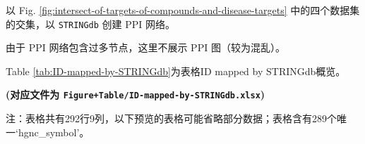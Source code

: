 \documentclass[
]{article}
\begin{document}
以 Fig. \ref{fig:intersect-of-targets-of-compounds-and-disease-targets} 中的四个数据集的交集，以 \texttt{STRINGdb} 创建 PPI 网络。

由于 PPI 网络包含过多节点，这里不展示 PPI 图（较为混乱）。

Table \ref{tab:ID-mapped-by-STRINGdb}为表格ID mapped by STRINGdb概览。

\textbf{(对应文件为 \texttt{Figure+Table/ID-mapped-by-STRINGdb.xlsx})}

\begin{center}\begin{tcolorbox}[colback=gray!10, colframe=gray!50, width=0.9\linewidth, arc=1mm, boxrule=0.5pt]注：表格共有292行9列，以下预览的表格可能省略部分数据；表格含有289个唯一`hgnc\_symbol'。
\end{tcolorbox}
\end{center}
\end{document}
